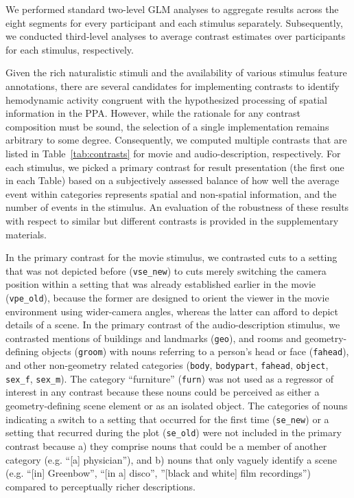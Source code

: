 \documentclass[english]{article}
\begin{document}
We performed standard two-level GLM analyses to aggregate results across the
eight segments for every participant and each stimulus separately.
Subsequently, we conducted third-level analyses to average contrast estimates
over participants for each stimulus, respectively.

Given the rich naturalistic stimuli and the availability of various stimulus
feature annotations, there are several candidates for implementing contrasts to
identify hemodynamic activity congruent with the hypothesized processing of
spatial information in the PPA.
However, while the rationale for any contrast composition must be sound, the
selection of a single implementation remains arbitrary to some degree.
Consequently, we computed multiple contrasts that are listed in
Table~\ref{tab:contrasts} for movie and audio-description, respectively.
For each stimulus, we picked a primary contrast for result presentation (the
first one in each Table) based on a subjectively assessed balance of how well
the average event within categories represents spatial and non-spatial
information, and the number of events in the stimulus.
An evaluation of the robustness of these results with respect to similar but
different contrasts is provided in the supplementary materials.

In the primary contrast for the movie stimulus, we contrasted cuts to a setting
that was not depicted before (\texttt{vse\_new}) to cuts merely switching the
camera position within a setting that was already established earlier in the
movie (\texttt{vpe\_old}), because the former are designed to orient the viewer
in the movie environment using wider-camera angles, whereas the latter can
afford to depict details of a scene.
In the primary contrast of the audio-description stimulus, we contrasted
mentions of buildings and landmarks (\texttt{geo}), and rooms and
geometry-defining objects (\texttt{groom}) with nouns referring to a person's
head or face (\texttt{fahead}), and other non-geometry related categories
(\texttt{body}, \texttt{bodypart}, \texttt{fahead}, \texttt{object},
\texttt{sex\_f}, \texttt{sex\_m}).
The category ``furniture'' (\texttt{furn}) was not used as a regressor of
interest in any contrast because these nouns could be perceived as either a
geometry-defining scene element or as an isolated object.
The categories of nouns indicating a switch to a setting that occurred for the
first time (\texttt{se\_new}) or a setting that recurred during the plot
(\texttt{se\_old}) were not included in the primary contrast because
a) they comprise nouns that could be a member of another category (e.g. ``[a]
physician''), and
b) nouns that only vaguely identify a scene (e.g. ``[in] Greenbow'', ``[in a]
disco'', ''[black and white] film recordings'') compared to perceptually richer
descriptions.
\end{document}
